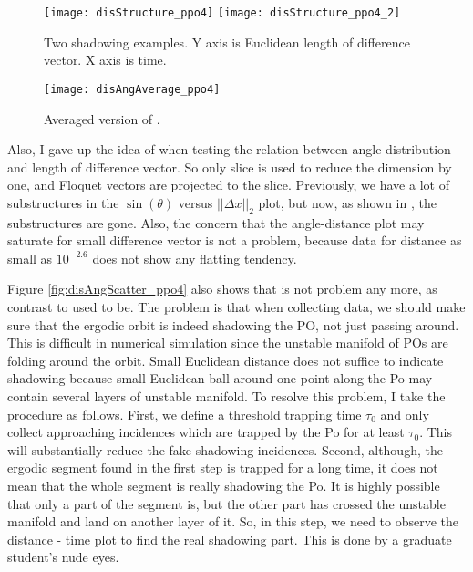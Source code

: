 \begin{description}
\begin{figure}[h]
  \centering
  \texttt{[image: disStructure\_ppo4]}
  \texttt{[image: disStructure\_ppo4\_2]}
  \caption{Two shadowing examples. Y axis is Euclidean length of
    difference vector. X axis is time.}
  \label{fig:disStructure}
\end{figure}

\begin{figure}[h]
  \centering
  \texttt{[image: disAngAverage\_ppo4]}
  \caption{Averaged version of .}
  \label{fig:disAngAverage_ppo4}
\end{figure}

Also, I gave up the idea of {\PoincSec} when testing the relation
between angle distribution and length of difference vector. So only
slice is used to reduce the dimension by one, and Floquet vectors are
projected to the slice. Previously, we have a lot of substructures in
the $\sin(\theta)$ versus $||\Delta x||_2$ plot, but now, as shown in
, the substructures are gone. Also, the
concern that the angle-distance plot may  saturate for small difference
vector is not a problem, because data for distance as small as
$10^{-2.6}$ does not show any flatting tendency.

Figure \ref{fig:disAngScatter_ppo4} also shows that 
is not problem any more, as contrast to used to be.
The problem is that when collecting data, we should make sure
that the ergodic orbit is indeed shadowing the PO, not just passing around.
This is difficult in numerical simulation since the unstable manifold of POs
are folding around the orbit.
Small Euclidean distance does not suffice to indicate
shadowing because small Euclidean ball around
one point along the Po may contain several
layers of unstable manifold. To resolve this problem, I take the procedure
as follows. First, we define a threshold trapping time $\tau_0$
and only collect approaching incidences which are trapped by the Po
for at least $\tau_0$. This will
substantially reduce the fake shadowing incidences. Second, although, the
ergodic segment found in the first step is trapped for a long time, it does
not mean that the whole segment is really shadowing the Po. It is highly
possible that only a part of the segment is, but the other part has crossed
the  unstable manifold and land on another layer of it.  So, in this step, we
need to observe the distance - time plot 
to find the real shadowing part. This is done by a graduate student's nude
eyes.


\end{description}
